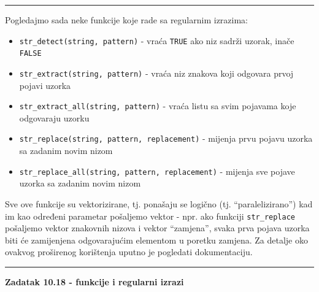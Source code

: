\documentclass[]{book}
\providecommand{\tightlist}{%
  \setlength{\itemsep}{0pt}\setlength{\parskip}{0pt}}
\theoremstyle{definition}
\theoremstyle{definition}
\theoremstyle{definition}
\theoremstyle{remark}
\begin{document}
\begin{center}\rule{0.5\linewidth}{\linethickness}\end{center}

Pogledajmo sada neke funkcije koje rade sa regularnim izrazima:

\begin{itemize}
\tightlist
\item
  \texttt{str\_detect(string,\ pattern)} - vraća \texttt{TRUE} ako niz
  sadrži uzorak, inače \texttt{FALSE}
\item
  \texttt{str\_extract(string,\ pattern)} - vraća niz znakova koji
  odgovara prvoj pojavi uzorka
\item
  \texttt{str\_extract\_all(string,\ pattern)} - vraća listu sa svim
  pojavama koje odgovaraju uzorku
\item
  \texttt{str\_replace(string,\ pattern,\ replacement)} - mijenja prvu
  pojavu uzorka sa zadanim novim nizom
\item
  \texttt{str\_replace\_all(string,\ pattern,\ replacement)} - mijenja
  sve pojave uzorka sa zadanim novim nizom
\end{itemize}

Sve ove funkcije su vektorizirane, tj. ponašaju se logično (tj.
``paralelizirano'') kad im kao određeni parametar pošaljemo vektor -
npr. ako funkciji \texttt{str\_replace} pošaljemo vektor znakovnih
nizova i vektor ``zamjena'', svaka prva pojava uzorka biti će
zamijenjena odgovarajućim elementom u poretku zamjena. Za detalje oko
ovakvog proširenog korištenja uputno je pogledati dokumentaciju.

\begin{center}\rule{0.5\linewidth}{\linethickness}\end{center}

\textbf{Zadatak 10.18 - funkcije i regularni izrazi}
\end{document}
